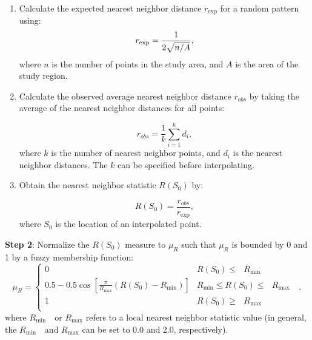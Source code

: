 \documentclass[final,5p,times,twocolumn,authoryear]{elsarticle}
\begin{document}
\begin{enumerate}[1)]
	\item Calculate the expected nearest neighbor distance $r_{\exp } $ for a random pattern using:
\begin{equation}
	\label{eq2}
	r_{\exp } =\frac{1}{2\sqrt {n \mathord{\left/ {\vphantom {n A}} \right. 
				\kern-\nulldelimiterspace} A} },
\end{equation}
where $n$ is the number of points in the study area, and $A$ is the area of the 
study region.

	\item Calculate the observed average nearest neighbor distance $r_{obs} $ by taking the average of the nearest neighbor distances for all points:

\begin{equation}
	\label{eq3}
	r_{obs} =\frac{1}{k}\sum\limits_{i=1}^k {d_i } ,
\end{equation}
where $k$ is the number of nearest neighbor points, and $d_i $ is the 
nearest neighbor distances. The $k$ can be specified before interpolating.


	\item Obtain the nearest neighbor statistic $R\left( {S_0 } \right)$ by:

\begin{equation}
	\label{eq4}
	R\left( {S_0 } \right)=\frac{r_{obs} }{r_{\exp } },
\end{equation}
where $S_{0 }$ is the location of an interpolated point.
\end{enumerate}

\textbf{Step 2}: Normalize the $R\left( {S_0 } \right)$ measure to $\mu _R $ 
such that $\mu _R $ is bounded by 0 and 1 by a fuzzy membership function: 
\begin{equation}
\label{eq5}
\mu _R =\left\{ {\begin{array}{ll}
	0&R\left( {S_0 } \right)\le \mbox{ }R_{\min } \mbox{ } \\ 
	0.5-0.5\cos \left[ {\frac{\pi }{R_{\max } }\left( {R\left( {S_0 } 
			\right)-R_{\min } } \right)} \right]&R_{\min } \le R\left( {S_0 } 
	\right)\le \mbox{ }R_{\max } \mbox{ } \\ 
	1&R\left( {S_0 } \right)\ge \mbox{ }R_{\max } \\ 
	\end{array}} \right.,
\end{equation}
	where $R_{\min } \mbox{ }$ or $R_{\max } $ refers to a local nearest neighbor 
	statistic value (in general, the $R_{\min } \mbox{ }$ and $R_{\max } $ can 
	be set to 0.0 and 2.0, respectively).
	
\end{document}
